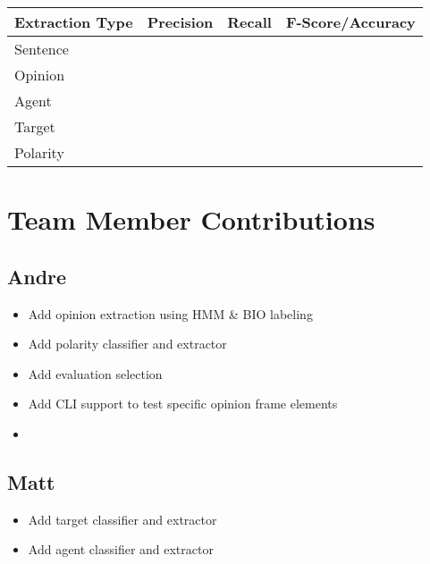 \documentclass{article}
\begin{document}
    \begin{center} %
        \begin{tabular}{ | l | c | r | c}
            \hline
            Extraction Type & Precision & Recall & F-Score/Accuracy \\ \hline
            Sentence &  &  & \\ \hline
            Opinion &  &  & \\ \hline
            Agent &  &  & \\ \hline
            Target &  &  & \\ \hline
            Polarity &  &  & \\ \hline
        \end{tabular}
    \end{center}

    \section{Team Member Contributions}

        \subsection{Andre}

            \begin{itemize}
                \item Add opinion extraction using HMM \& BIO labeling
                \item Add polarity classifier and extractor
                \item Add evaluation selection
                \item Add CLI support to test specific opinion frame elements
                \item
            \end{itemize}

        \subsection{Matt}

            \begin{itemize}
                \item Add target classifier and extractor
                \item Add agent classifier and extractor
            \end{itemize}
\end{document}
